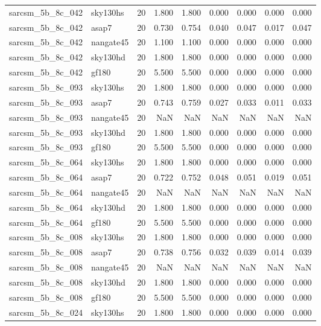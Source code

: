\begin{tabular}{llrrrrrrr}
sarcsm\_5b\_8c\_042 & sky130hs & 20 & 1.800 & 1.800 & 0.000 & 0.000 & 0.000 & 0.000 \\
sarcsm\_5b\_8c\_042 & asap7 & 20 & 0.730 & 0.754 & 0.040 & 0.047 & 0.017 & 0.047 \\
sarcsm\_5b\_8c\_042 & nangate45 & 20 & 1.100 & 1.100 & 0.000 & 0.000 & 0.000 & 0.000 \\
sarcsm\_5b\_8c\_042 & sky130hd & 20 & 1.800 & 1.800 & 0.000 & 0.000 & 0.000 & 0.000 \\
sarcsm\_5b\_8c\_042 & gf180 & 20 & 5.500 & 5.500 & 0.000 & 0.000 & 0.000 & 0.000 \\
sarcsm\_5b\_8c\_093 & sky130hs & 20 & 1.800 & 1.800 & 0.000 & 0.000 & 0.000 & 0.000 \\
sarcsm\_5b\_8c\_093 & asap7 & 20 & 0.743 & 0.759 & 0.027 & 0.033 & 0.011 & 0.033 \\
sarcsm\_5b\_8c\_093 & nangate45 & 20 & NaN & NaN & NaN & NaN & NaN & NaN \\
sarcsm\_5b\_8c\_093 & sky130hd & 20 & 1.800 & 1.800 & 0.000 & 0.000 & 0.000 & 0.000 \\
sarcsm\_5b\_8c\_093 & gf180 & 20 & 5.500 & 5.500 & 0.000 & 0.000 & 0.000 & 0.000 \\
sarcsm\_5b\_8c\_064 & sky130hs & 20 & 1.800 & 1.800 & 0.000 & 0.000 & 0.000 & 0.000 \\
sarcsm\_5b\_8c\_064 & asap7 & 20 & 0.722 & 0.752 & 0.048 & 0.051 & 0.019 & 0.051 \\
sarcsm\_5b\_8c\_064 & nangate45 & 20 & NaN & NaN & NaN & NaN & NaN & NaN \\
sarcsm\_5b\_8c\_064 & sky130hd & 20 & 1.800 & 1.800 & 0.000 & 0.000 & 0.000 & 0.000 \\
sarcsm\_5b\_8c\_064 & gf180 & 20 & 5.500 & 5.500 & 0.000 & 0.000 & 0.000 & 0.000 \\
sarcsm\_5b\_8c\_008 & sky130hs & 20 & 1.800 & 1.800 & 0.000 & 0.000 & 0.000 & 0.000 \\
sarcsm\_5b\_8c\_008 & asap7 & 20 & 0.738 & 0.756 & 0.032 & 0.039 & 0.014 & 0.039 \\
sarcsm\_5b\_8c\_008 & nangate45 & 20 & NaN & NaN & NaN & NaN & NaN & NaN \\
sarcsm\_5b\_8c\_008 & sky130hd & 20 & 1.800 & 1.800 & 0.000 & 0.000 & 0.000 & 0.000 \\
sarcsm\_5b\_8c\_008 & gf180 & 20 & 5.500 & 5.500 & 0.000 & 0.000 & 0.000 & 0.000 \\
sarcsm\_5b\_8c\_024 & sky130hs & 20 & 1.800 & 1.800 & 0.000 & 0.000 & 0.000 & 0.000 \\

\end{tabular}

